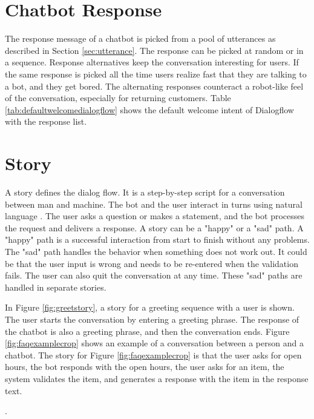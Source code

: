 \section{Chatbot Response} \label{sec:chatbot_response}
The response message of a chatbot is picked from a pool of utterances as described in Section \ref{sec:utterance}.
The response can be picked at random or in a sequence.
Response alternatives keep the conversation interesting for users.
If the same response is picked all the time users realize fast that they are 
talking to a bot, and they get bored. 
The alternating responses counteract a robot-like feel of the conversation, especially for returning customers. 
Table \ref{tab:defaultwelcomedialogflow} shows the default welcome intent of Dialogflow with the response list.

\section{Story}
A story defines the dialog flow. 
It is a step-by-step script for a conversation between man and machine.
The bot and the user interact in turns using natural language \cite{evaluateChatbotsShawar2007, shawar2007chatbots, huang2007extracting, gregori2017evaluation}.
The user asks a question or makes a statement, and the bot processes the request and delivers a response.
A story can be a "happy" or a "sad" path.
A "happy" path is a successful interaction from start to finish without any problems.
The "sad" path handles the behavior when something does not work out.
It could be that the user input is wrong and needs to be re-entered when the validation fails.
The user can also quit the conversation at any time.
These "sad" paths are handled in separate stories.

In Figure \ref{fig:greetstory}, a story for a greeting sequence with a user is shown. 
The user starts the conversation by entering a greeting phrase. 
The response of the chatbot is also a greeting phrase, and then the conversation ends. 
Figure \ref{fig:faqexamplecrop} shows an example of a conversation between a person and a chatbot.
The story for Figure \ref{fig:faqexamplecrop} is that the user asks for open hours, the bot responds with the open hours, the user asks for an item, the system validates the item, and generates a response with 
the item in the response text.


\cite{braunEvaluatingNLU}.
